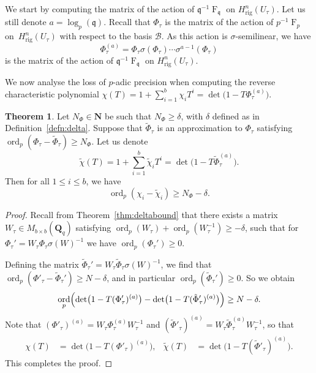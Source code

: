 \documentclass[a4paper,11pt]{article}
\numberwithin{equation}{section}
\newcommand{\NN}{\mathbf{N}} %
\newcommand{\QQ}{\mathbf{Q}} %
\DeclareMathOperator{\ord}{ord}          %
\DeclareMathOperator{\Frob}{F}           %
\providecommand{\Hrig}{H_{\text{rig}}}  %
\providecommand{\cB}{\mathcal{B}} %
\theoremstyle{definition}
\newtheorem{thm}{Theorem}[section]
\begin{document}
We start by computing the matrix of the action 
of $\mathfrak{q}^{-1} \Frob_{\mathfrak{q}}$ on $\Hrig^n(U_{\tau})$. 
Let us still denote $a=\log_p(\mathfrak{q})$. Recall that $\Phi_{\tau}$ 
is the matrix of the action of $p^{-1} \Frob_p$ on~$\Hrig^{n}(U_{\tau})$ 
with respect to the basis $\cB$. As this action is $\sigma$-semilinear, 
we have
\begin{equation*}
\Phi_{\tau}^{(a)} = 
    \Phi_{\tau} \sigma(\Phi_{\tau}) \dotsm \sigma^{a-1}(\Phi_{\tau})
\end{equation*}
is the matrix of the action of $\mathfrak{q}^{-1} \Frob_{\mathfrak{q}}$ 
on $\Hrig^n(U_{\tau})$. 

We now analyse the loss of $p$-adic precision when computing 
the reverse characteristic polynomial 
$\chi(T)=1+\sum_{i=1}^b \chi_i T^i=\det\bigl( 1 - T \Phi_{\tau}^{(a)}\bigr)$.

\begin{thm} \label{thm:preccharpoly}
Let $N_{\Phi} \in \NN$ be such that $N_{\Phi} \geq \delta$, 
with $\delta$ defined as in Definition~\ref{defn:delta}.
Suppose that $\tilde{\Phi}_{\tau}$ is an approximation to $\Phi_{\tau}$ satisfying
$\ord_p (\Phi_{\tau}-\tilde{\Phi}_{\tau}) \geq N_{\Phi}$.
Let us denote
\[
\tilde{\chi}(T) = 1 + \sum_{i=1}^b \tilde{\chi}_i T^i 
                = \det\bigl( 1 - T \tilde{\Phi}_{\tau}^{(a)}\bigr).
\]
Then for all $1 \leq i \leq b$, we have
\[
\ord_p (\chi_i - \tilde{\chi}_i) \geq N_{\Phi}-\delta.
\]
\end{thm}

\begin{proof} 
Recall from Theorem~\ref{thm:deltabound} that there exists a matrix 
$W_{\tau} \in M_{b \times b}(\QQ_q)$ satisfying 
$\ord_p(W_{\tau})+\ord_p(W_{\tau}^{-1}) \geq -\delta$, such that for 
$\Phi_{\tau}'=W_{\tau} \Phi_{\tau} \sigma(W)^{-1}$ 
we have \mbox{$\ord_p(\Phi_{\tau}') \geq 0$}.

Defining the matrix 
$\tilde{\Phi}_{\tau}'=W_{\tau} \tilde{\Phi}_{\tau} \sigma(W)^{-1}$, we find that 
$\ord_p(\Phi'_{\tau}-\tilde{\Phi}_{\tau}') \geq N-\delta$, and in particular
$\ord_p(\tilde{\Phi}_{\tau}') \geq 0$. So we obtain
\[
\ord_p \Bigl( \det\bigl(1 - T (\Phi'_{\tau})^{(a)}\bigr) 
            - \det\bigl(1 - T (\tilde{\Phi}'_{\tau})^{(a)}\bigr) \Bigr) \geq N-\delta.
\] 
Note that $(\Phi'_{\tau})^{(a)}= W_{\tau} \Phi_{\tau}^{(a)} W_{\tau}^{-1}$
and $(\tilde{\Phi}'_{\tau})^{(a)}= W_{\tau} \tilde{\Phi}_{\tau}^{(a)} W_{\tau}^{-1}$, so that
\begin{align*}
\chi(T) &= \det\bigl(1 - T (\Phi'_{\tau})^{(a)}\bigr),
&\tilde{\chi}(T) &= \det\bigl(1 - T (\tilde{\Phi}'_{\tau})^{(a)}\bigr).
\end{align*}
This completes the proof.
\end{proof}
\end{document}
